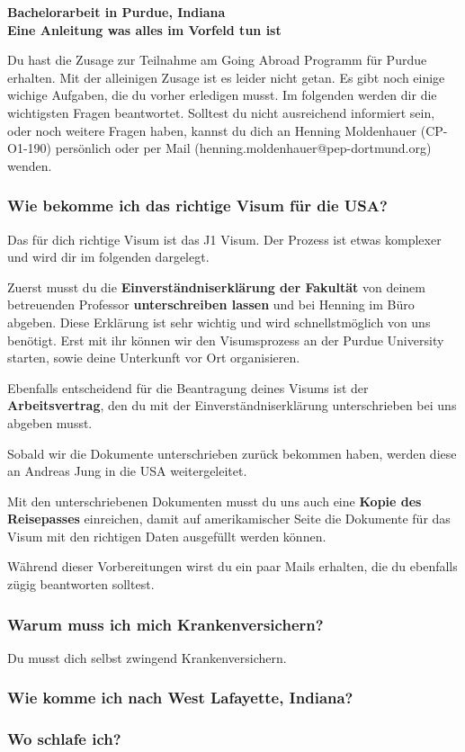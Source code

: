 \documentclass[
  paper=a4,
  fontsize=12pt,
  DIV=16,
  headheight=52pt,
  footheight=45pt,
  headinclude,
  parskip=full,
]{scrartcl}
\date{31. Juli 2014}
\begin{document}
\textbf{\Huge\sffamily Bachelorarbeit in Purdue, Indiana}\\[0.5\baselineskip]
\textbf{\Large\sffamily Eine Anleitung was alles im Vorfeld tun ist}

Du hast die Zusage zur Teilnahme am Going Abroad Programm für Purdue erhalten.
Mit der alleinigen Zusage ist es leider nicht getan.
Es gibt noch einige wichige Aufgaben, die du vorher erledigen musst.
Im folgenden werden dir die wichtigsten Fragen beantwortet.
Solltest du nicht ausreichend informiert sein, oder noch weitere Fragen haben,
kannst du dich an Henning Moldenhauer (CP-O1-190) persönlich oder per Mail
(henning.moldenhauer@pep-dortmund.org) wenden.

\subsubsection*{Wie bekomme ich das richtige Visum für die USA?}
Das für dich richtige Visum ist das J1 Visum.
Der Prozess ist etwas komplexer und wird dir im folgenden dargelegt.

Zuerst musst du die \textbf{Einverständniserklärung der Fakultät} von deinem
betreuenden Professor \textbf{unterschreiben lassen} und bei Henning im Büro
abgeben.
Diese Erklärung ist sehr wichtig und wird schnellstmöglich von uns benötigt.
Erst mit ihr können wir den Visumsprozess an der Purdue University starten, sowie
deine Unterkunft vor Ort organisieren.

Ebenfalls entscheidend für die Beantragung deines Visums ist der
\textbf{Arbeitsvertrag}, den du mit der Einverständniserklärung unterschrieben
bei uns abgeben musst.

Sobald wir die Dokumente unterschrieben zurück bekommen haben, werden diese an
Andreas Jung in die USA weitergeleitet.

Mit den unterschriebenen Dokumenten musst du uns auch eine
\textbf{Kopie des Reisepasses} einreichen, damit auf amerikamischer Seite die
Dokumente für das Visum mit den richtigen Daten ausgefüllt werden können.

Während dieser Vorbereitungen wirst du ein paar Mails erhalten, die du
ebenfalls zügig beantworten solltest.

\subsubsection*{Warum muss ich mich Krankenversichern?}
Du musst dich selbst zwingend Krankenversichern.

\subsubsection*{Wie komme ich nach West Lafayette, Indiana?}

\subsubsection*{Wo schlafe ich?}
\end{document}
